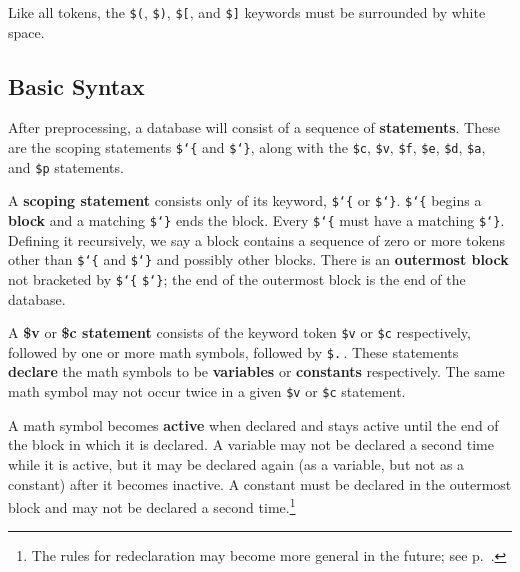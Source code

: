 Like all tokens, the \texttt{\$(}, \texttt{\$)}, \texttt{\$[}, and \texttt{\$]} keywords
must be surrounded by white space.

\subsection{Basic Syntax}

After preprocessing, a database will consist of a sequence of {\bf
statements}.
These are the scoping statements \texttt{\$\char`\{} and
\texttt{\$\char`\}}, along with the \texttt{\$c}, \texttt{\$v},
\texttt{\$f}, \texttt{\$e}, \texttt{\$d}, \texttt{\$a}, and \texttt{\$p}
statements.

A {\bf scoping statement} consists only of its
keyword, \texttt{\$\char`\{} or \texttt{\$\char`\}}. \texttt{\$\char`\{} begins a {\bf
block} and a matching \texttt{\$\char`\}} ends the block. Every \texttt{\$\char`\{}
must have a matching \texttt{\$\char`\}}. Defining it recursively, we say a block
contains a sequence of zero or more tokens other
than \texttt{\$\char`\{} and \texttt{\$\char`\}} and
possibly other blocks.  There is an {\bf outermost
block} not bracketed by \texttt{\$\char`\{} \texttt{\$\char`\}}; the end
of the outermost block is the end of the database.


A {\bf \$v} or {\bf \$c statement} consists of the keyword token \texttt{\$v} or \texttt{\$c} respectively,
followed by one or more math symbols, followed by \texttt{\$.}\,.  These
statements {\bf declare} the math symbols to be {\bf
variables} or {\bf constants}
respectively. The same math symbol may not occur twice in a given \texttt{\$v} or
\texttt{\$c} statement.


A math symbol becomes {\bf active} when declared
and stays active until the end of the block in which it is declared.  A
variable may not be declared a second time while it is active, but it
may be declared again (as a variable, but not as a constant) after it
becomes inactive.  A constant must be declared in the outermost block and may
not be declared a second time.\footnote{The rules for redeclaration may
become more general in the future;
see p.~\pageref{redeclarationf}.}

